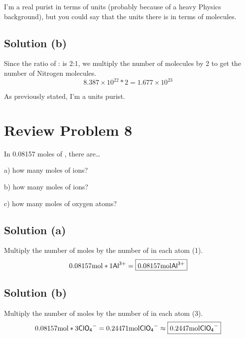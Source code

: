 \documentclass[10pt]{article}
\begin{document}
            I'm a real purist in terms of units (probably because of a heavy Physics background), but you could say that the units there is in terms of molecules.
        
        \subsection{Solution (b)}
            Since the ratio of : is 2:1, we multiply the number of molecules by 2 to get the number of Nitrogen molecules.
            \begin{equation}
                8.387 \times 10^{22} * 2 = \boxed{1.677 \times 10^{23}}
            \end{equation}

            As previously stated, I'm a units purist.
    
    \pagebreak
    \section{Review Problem 8}
        In 0.08157 moles of , there are…
        
        a) how many moles of  ions?
        
        b) how many moles of  ions?
        
        c) how many moles of oxygen atoms?

        \subsection{Solution (a)}
            Multiply the number of moles by the number of  in each atom (1).
            \begin{equation}
                0.08157 \unit{\mol} * 1 \ce{Al^3+} = \boxed{0.08157 \unit{\mol} \ce{Al^3+}}
            \end{equation}

        \subsection{Solution (b)}
            Multiply the number of moles by the number of  in each atom (3).
            \begin{equation}
                0.08157 \unit{\mol} * 3 \ce{ClO4-} = 0.24471 \unit{\mol} \ce{ClO4-} \approx \boxed{0.2447 \unit{\mol} \ce{ClO4-}}
            \end{equation}
\end{document}

